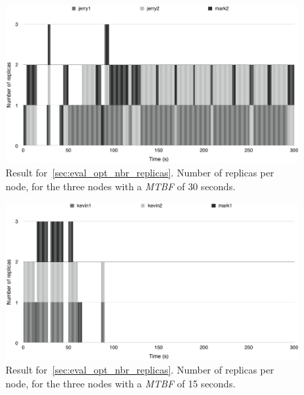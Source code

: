 \documentclass{cslthse-msc}
\begin{document}
\begin{figure}[!hbt]
\centering
\includegraphics[scale=0.5]{images/results/optimal_replicas/MTBF_30.pdf}
\caption[Number of replicas in~\cref{sec:eval_opt_nbr_replicas} on nodes with \emph{MTBF} = 30 s]{Result for~\cref{sec:eval_opt_nbr_replicas}. Number of replicas per node, for the three nodes with a \emph{MTBF} of 30 seconds.} \label{fig:exp_opt_replicas_MTBF_30}
\end{figure}

\begin{figure}[!hbt]
\centering
\includegraphics[scale=0.5]{images/results/optimal_replicas/MTBF_15.pdf}
\caption[Number of replicas in~\cref{sec:eval_opt_nbr_replicas} on nodes with \emph{MTBF} = 15 s]{Result for~\cref{sec:eval_opt_nbr_replicas}. Number of replicas per node, for the three nodes with a \emph{MTBF} of 15 seconds.} \label{fig:exp_opt_replicas_MTBF_15}
\end{figure}
\end{document}
